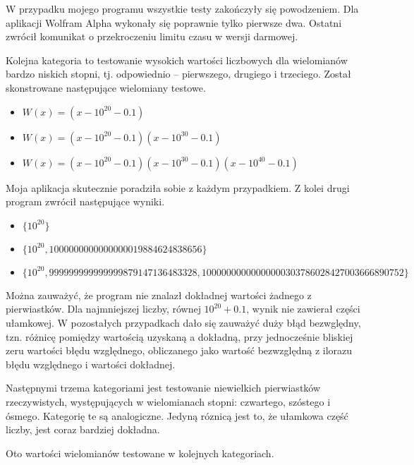\documentclass[oneside,a4paper]{book}
\begin{document}
	W przypadku mojego programu wszystkie testy zakończyły się powodzeniem. Dla aplikacji Wolfram Alpha wykonały się poprawnie tylko pierwsze dwa. Ostatni zwrócił komunikat o przekroczeniu limitu czasu w wersji darmowej.
	
	Kolejna kategoria to testowanie wysokich wartości liczbowych dla wielomianów bardzo niskich stopni, tj. odpowiednio -- pierwszego, drugiego i trzeciego. Został skonstrowane następujące wielomiany testowe.
	\begin{itemize}
		\item $W(x)=(x-10^{20}-0.1)$
		\item $W(x)=(x-10^{20}-0.1)(x-10^{30}-0.1)$
		\item $W(x)=(x-10^{20}-0.1)(x-10^{30}-0.1)(x-10^{40}-0.1)$
	\end{itemize}
	
	Moja aplikacja skutecznie poradziła sobie z każdym przypadkiem. Z kolei drugi program zwrócił następujące wyniki.
	\begin{itemize}
		\item $\{10^{20}\}$
		\item $\{10^{20}, 1000000000000000019884624838656\}$
		\item $\{10^{20}, 999999999999999879147136483328, 10000000000000000303786028427003666890752\}$
	\end{itemize}

	Można zauważyć, że program nie znalazł dokładnej wartości żadnego z pierwiastków. Dla najmniejszej liczby, równej $10^{20}+0.1$, wynik nie zawierał części ułamkowej. W pozostałych przypadkach dało się zauważyć duży błąd bezwględny, tzn. różnicę pomiędzy wartością uzyskaną a dokładną, przy jednocześnie bliskiej zeru wartości błędu względnego, obliczanego jako wartość bezwzględną z ilorazu błędu względnego i wartości dokładnej.
	
	Następnymi trzema kategoriami jest testowanie niewielkich pierwiastków rzeczywistych, występujących w wielomianach stopni: czwartego, szóstego i ósmego. Kategorię te są analogiczne. Jedyną róznicą jest to, że ułamkowa część liczby, jest coraz bardziej dokładna.
	
	Oto wartości wielomianów testowane w kolejnych kategoriach.
	
\end{document}
